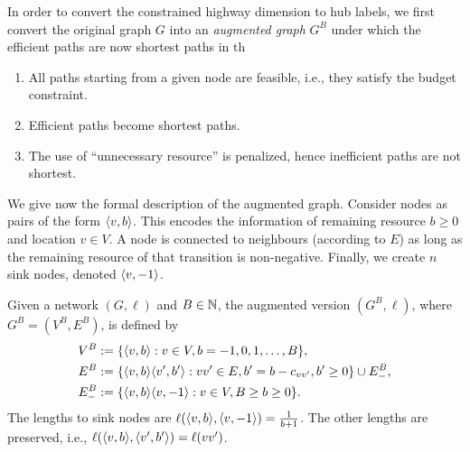 

In order to convert the constrained highway dimension to hub labels, we first convert the original graph $G$ into an \emph{augmented graph} $G^B$ under which the efficient paths are now shortest paths in th
\begin{enumerate}[nosep]
\item All paths starting from a given node are feasible, i.e., they satisfy the budget constraint.
\item Efficient paths become shortest paths.
\item The use of ``unnecessary resource'' is penalized, hence inefficient paths are not shortest.
\end{enumerate}

We give now the formal description of the augmented graph.
Consider nodes as pairs of the form $\langle v,b\rangle$. 
This encodes the information of remaining resource $b\geq 0$ and location $v\in V$.
A node is connected to neighbours (according to $E$) as long as the remaining resource of that transition is non-negative.
Finally, we create $n$ sink nodes, denoted $\langle v,-1\rangle$.

\begin{definition}
Given a network $(G,\ell)$ and $B\in\mathbb{N}$, the augmented version $(G^B,\ell)$, where $G^B=(V^B,E^B)$, is defined by
\begin{align*}
V^B &:=\{\langle v,b\rangle: v\in V, b=-1,0,1,\ldots,B\},\\
E^B &:=\{\langle v,b\rangle\langle v',b'\rangle : vv'\in E, b'=b-c_{vv'}, b'\geq 0\}\cup E^{B}_{-},\\
E^{B}_{-} &:= \{\langle v,b\rangle\langle v,-1\rangle: v\in V, B\geq b\geq 0\}.
\end{align*}
The lengths to sink nodes are $\ell(\langle v,b\rangle,\langle v,-1\rangle)=\frac{1}{b+1}$.
The other lengths are preserved, i.e., $\ell(\langle v,b\rangle,\langle v',b'\rangle)=\ell(vv')$.
\end{definition}

